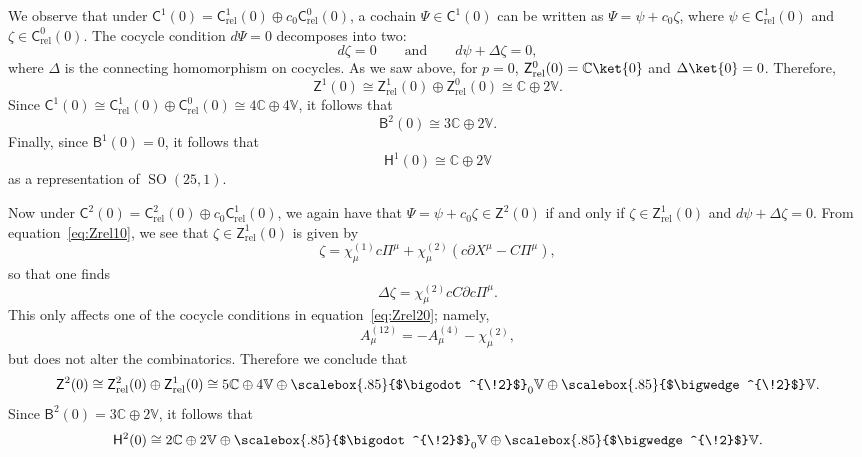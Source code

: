 \documentclass[11pt,reqno,a4paper,final]{amsart}
\newcommand\ext[1]{\scalebox{.85}{$\bigwedge^{\!#1}$}}
\newcommand\sym[1]{\scalebox{.85}{$\bigodot^{\!#1}$}}
\theoremstyle{plain}
\theoremstyle{definition}
\renewcommand{\d}{\partial}
\newcommand{\sB}{\mathsf{B}}
\newcommand{\sZ}{\mathsf{Z}}
\newcommand{\sC}{\mathsf{C}}
\newcommand{\sH}{\mathsf{H}}
\newcommand{\Crel}{\mathsf{C}_{\mathrm{rel}}} %
\newcommand{\Zrel}{\mathsf{Z}_{\mathrm{rel}}}
\newcommand{\VV}{\mathbb{V}}
\newcommand{\CC}{\mathbb{C}}
\newcommand{\1}{\mathbb{1}}
\newcommand{\SO}{\operatorname{SO}}
\numberwithin{equation}{section}
\begin{document}
We observe that under $\sC^1(0) = \Crel^1(0) \oplus c_0 \Crel^0(0)$, a
cochain $\Psi \in \sC^1(0)$ can be written as $\Psi = \psi + c_0
\zeta$, where $\psi \in \Crel^1(0)$ and $\zeta \in \Crel^0(0)$.  The
cocycle condition $d\Psi = 0$ decomposes into two:
\begin{equation}
  d\zeta = 0 \qquad\text{and}\qquad d\psi + \Delta\zeta = 0,
\end{equation}
where $\Delta$ is the connecting homomorphism on cocycles.  As we saw
above, for $p=0$, $\Zrel^0(0) = \CC \ket{0}$ and $\Delta \ket{0} = 0$.  Therefore,
\begin{equation}
  \sZ^1(0) \cong \Zrel^1(0) \oplus \Zrel^0(0) \cong \CC \oplus 2 \VV.
\end{equation}
Since $\sC^1(0) \cong \Crel^1(0) \oplus \Crel^0(0) \cong 4 \CC \oplus
4 \VV$, it follows that
\begin{equation}
  \sB^2(0) \cong 3 \CC \oplus 2 \VV.
\end{equation}
Finally, since $\sB^1(0) = 0$, it follows that
\begin{equation}
  \sH^1(0) \cong \CC \oplus 2 \VV
\end{equation}
as a representation of $\SO(25,1)$.

Now under $\sC^2(0) = \Crel^2(0) \oplus c_0 \Crel^1(0)$, we again have
that $\Psi  = \psi + c_0 \zeta \in \sZ^2(0)$ if and only if $\zeta \in
\Zrel^1(0)$ and $d \psi + \Delta \zeta = 0$.  From
equation~\eqref{eq:Zrel10}, we see that $\zeta \in \Zrel^1(0)$ is
given by
\begin{equation}
  \zeta = \chi^{(1)}_\mu c \Pi^\mu + \chi^{(2)}_\mu\left( c \d X^\mu - C \Pi^\mu \right),
\end{equation}
so that one finds
\begin{equation}
  \Delta \zeta = \chi^{(2)}_\mu c C \d c  \Pi^\mu.
\end{equation}
This only affects one of the cocycle conditions in
equation~\eqref{eq:Zrel20}; namely,
\begin{equation}
  A^{(12)}_\mu = - A^{(4)}_\mu - \chi^{(2)}_\mu, 
\end{equation}
but does not alter the combinatorics.  Therefore we conclude that
\begin{equation}
  \sZ^2(0) \cong \Zrel^2(0) \oplus \Zrel^1(0) \cong 5 \CC \oplus 4 \VV
  \oplus \sym{2}_0 \VV \oplus \ext{2} \VV.
\end{equation}
Since $\sB^2(0) = 3 \CC \oplus 2 \VV$, it follows that
\begin{equation}
  \sH^2(0) \cong 2 \CC \oplus 2 \VV \oplus \sym{2}_0 \VV \oplus \ext{2} \VV.
\end{equation}
\end{document}
